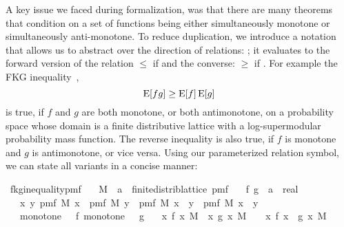 A key issue we faced during formalization, was that there are many theorems that condition on a set of functions being either simultaneously monotone or simultaneously anti-monotone.
To reduce duplication, we introduce a notation that allows us to abstract over the direction of relations: \isa{\isasymle\isasymge\isactrlbsub\isasymeta\isactrlesub}; it evaluates to the forward version of the relation $\leq$ if  and the converse: $\geq$ if .
For example the FKG inequality~\cite[Ch. 6]{alon2000},\cite{fortuin1971}
\[
  \operatorname{\mathrm{E}} [f g] \geq \operatorname{\mathrm{E}} [f] \operatorname{\mathrm{E}} [g]
\]
is true, if $f$ and $g$ are both monotone, or both antimonotone, on a probability space whose domain is a finite distributive lattice with a log-supermodular probability mass function.
The reverse inequality is also true, if $f$ is monotone and $g$ is antimonotone, or vice versa.
Using our parameterized relation symbol, we can state all variants in a concise manner:
\begin{isabelle_cm}
\isamarkupfalse%
\ fkg{\isacharunderscore}{\kern0pt}inequality{\isacharunderscore}{\kern0pt}pmf{\isacharcolon}{\kern0pt}\isanewline
\ \ \ M\ {\isacharcolon}{\kern0pt}{\isacharcolon}{\kern0pt}\ {\isacartoucheopen}{\isacharparenleft}{\kern0pt}{\isacharprime}{\kern0pt}a\ {\isacharcolon}{\kern0pt}{\isacharcolon}{\kern0pt}\ finite{\isacharunderscore}{\kern0pt}distrib{\isacharunderscore}{\kern0pt}lattice{\isacharparenright}{\kern0pt}\ pmf{\isacartoucheclose}\isanewline
\ \ \ f\ g\ {\isacharcolon}{\kern0pt}{\isacharcolon}{\kern0pt}\ {\isacartoucheopen}{\isacharprime}{\kern0pt}a\ {\isasymRightarrow}\ real{\isacartoucheclose}\isanewline
\ \ \ {\isacartoucheopen}{\isasymAnd}x\ y{\isachardot}{\kern0pt}\ pmf\ M\ x\ {\isacharasterisk}{\kern0pt}\ pmf\ M\ y\ {\isasymle}\ pmf\ M\ {\isacharparenleft}{\kern0pt}x\ {\isasymsqunion}\ y{\isacharparenright}{\kern0pt}\ {\isacharasterisk}{\kern0pt}\ pmf\ M\ {\isacharparenleft}{\kern0pt}x\ {\isasymsqinter}\ y{\isacharparenright}{\kern0pt}{\isacartoucheclose}\isanewline
\ \ \ {\isacartoucheopen}monotone\ {\isacharparenleft}{\kern0pt}{\isasymle}{\isacharparenright}{\kern0pt}\ {\isacharparenleft}{\kern0pt}{\isasymle}{\isasymge}\isactrlbsub {\isasymtau}\isactrlesub {\isacharparenright}{\kern0pt}\ f{\isacartoucheclose}\ {\isacartoucheopen}monotone\ {\isacharparenleft}{\kern0pt}{\isasymle}{\isacharparenright}{\kern0pt}\ {\isacharparenleft}{\kern0pt}{\isasymle}{\isasymge}\isactrlbsub {\isasymsigma}\isactrlesub {\isacharparenright}{\kern0pt}\ g{\isacartoucheclose}\isanewline
\ \ \ {\isacartoucheopen}{\isacharparenleft}{\kern0pt}{\isasymintegral}x{\isachardot}{\kern0pt}\ f\ x\ {\isasympartial}M{\isacharparenright}{\kern0pt}\ {\isacharasterisk}{\kern0pt}\ {\isacharparenleft}{\kern0pt}{\isasymintegral}x{\isachardot}{\kern0pt}\ g\ x\ {\isasympartial}M{\isacharparenright}{\kern0pt}\ {\isasymle}{\isasymge}\isactrlbsub {\isasymtau}\ {\isacharasterisk}{\kern0pt}\ {\isasymsigma}\isactrlesub \ {\isacharparenleft}{\kern0pt}{\isasymintegral}x{\isachardot}{\kern0pt}\ f\ x\ {\isacharasterisk}{\kern0pt}\ g\ x\ {\isasympartial}M{\isacharparenright}{\kern0pt}{\isacartoucheclose}
\end{isabelle_cm}
